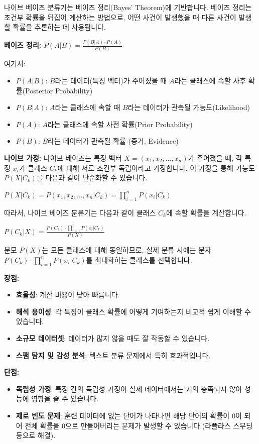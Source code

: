 \documentclass[11pt,a4paper]{article}
\begin{document}
나이브 베이즈 분류기는 베이즈 정리(Bayes' Theorem)에 기반합니다. 베이즈 정리는 조건부 확률을 뒤집어 계산하는 방법으로, 어떤 사건이 발생했을 때 다른 사건이 발생할 확률을 추론하는 데 사용됩니다.

\textbf{베이즈 정리:}
$P(A|B) = \frac{P(B|A) \cdot P(A)}{P(B)}$

여기서:
\begin{itemize}
    \item $P(A|B)$: $B$라는 데이터(특징 벡터)가 주어졌을 때 $A$라는 클래스에 속할 사후 확률(Posterior Probability)
    \item $P(B|A)$: $A$라는 클래스에 속할 때 $B$라는 데이터가 관측될 가능도(Likelihood)
    \item $P(A)$: $A$라는 클래스에 속할 사전 확률(Prior Probability)
    \item $P(B)$: $B$라는 데이터가 관측될 확률 (증거, Evidence)
\end{itemize}

\textbf{나이브 가정:}
나이브 베이즈는 특징 벡터 $X = (x_1, x_2, \dots, x_n)$가 주어졌을 때, 각 특징 $x_i$가 클래스 $C_k$에 대해 서로 조건부 독립이라고 가정합니다. 이 가정을 통해 가능도 $P(X|C_k)$를 다음과 같이 단순화할 수 있습니다.

$P(X|C_k) = P(x_1, x_2, \dots, x_n | C_k) = \prod_{i=1}^{n} P(x_i | C_k)$

따라서, 나이브 베이즈 분류기는 다음과 같이 클래스 $C_k$에 속할 확률을 계산합니다.

$P(C_k|X) = \frac{P(C_k) \cdot \prod_{i=1}^{n} P(x_i | C_k)}{P(X)}$

분모 $P(X)$는 모든 클래스에 대해 동일하므로, 실제 분류 시에는 분자 $P(C_k) \cdot \prod_{i=1}^{n} P(x_i | C_k)$를 최대화하는 클래스를 선택합니다.

\textbf{장점:}
\begin{itemize}
    \item \textbf{효율성}: 계산 비용이 낮아 빠릅니다.
    \item \textbf{해석 용이성}: 각 특징이 클래스 확률에 어떻게 기여하는지 비교적 쉽게 이해할 수 있습니다.
    \item \textbf{소규모 데이터셋}: 데이터가 많지 않을 때도 잘 작동할 수 있습니다.
    \item \textbf{스팸 탐지 및 감성 분석}: 텍스트 분류 문제에서 특히 효과적입니다.
\end{itemize}

\textbf{단점:}
\begin{itemize}
    \item \textbf{독립성 가정}: 특징 간의 독립성 가정이 실제 데이터에서는 거의 충족되지 않아 성능에 영향을 줄 수 있습니다.
    \item \textbf{제로 빈도 문제}: 훈련 데이터에 없는 단어가 나타나면 해당 단어의 확률이 0이 되어 전체 확률을 0으로 만들어버리는 문제가 발생할 수 있습니다 (라플라스 스무딩 등으로 해결).
\end{itemize}
\end{document}
